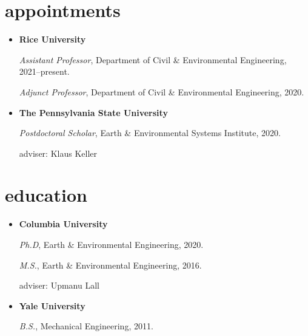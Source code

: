 \documentclass[10pt,oneside]{article}
\begin{document}

\section{appointments}

\mbox{}\vspace{-\dimexpr\baselineskip\relax}

\begin{itemize}[label={}]
  
  \item \textbf{Rice University}
        
        \textit{Assistant Professor}, Department of Civil \& Environmental Engineering, 2021--present.
        
        
        \textit{Adjunct Professor}, Department of Civil \& Environmental Engineering, 2020.
        
        
        
  \item \textbf{The Pennsylvania State University}
        
        \textit{Postdoctoral Scholar}, Earth \& Environmental Systems Institute, 2020.
        
        adviser: Klaus Keller
        
        
        
\end{itemize}


\section{education}

\mbox{}\vspace{-\dimexpr\baselineskip\relax}

\begin{itemize}[label={}]
  
  \item \textbf{Columbia University}
        
        \textit{Ph.D}, Earth \& Environmental Engineering, 2020.
        
        \textit{M.S.}, Earth \& Environmental Engineering, 2016.
        
        
        adviser: Upmanu Lall
        
        
  \item \textbf{Yale University}
        
        \textit{B.S.}, Mechanical Engineering, 2011.
        
        
        
\end{itemize}
\end{document}
